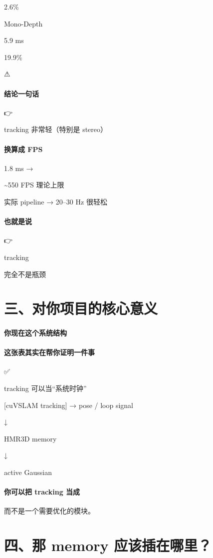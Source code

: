 \documentclass[12pt]{article}
\begin{document}
2.6\%

Mono-Depth

5.9 ms

19.9\%

⚠

\paragraph{结论一句话}
👉

tracking 非常轻（特别是 stereo）

\paragraph{换算成 FPS}
1.8 ms →

\textasciitilde{}550 FPS 理论上限

实际 pipeline → 20–30 Hz 很轻松

\paragraph{也就是说}
👉

tracking

完全不是瓶颈

\section{三、对你项目的核心意义}
\paragraph{你现在这个系统结构}
\paragraph{这张表其实在帮你证明一件事}
✅

tracking 可以当“系统时钟”

[cuVSLAM tracking] → pose / loop signal

↓

HMR3D memory

↓

active Gaussian

\paragraph{你可以把 tracking 当成}
而不是一个需要优化的模块。

\section{四、那 memory 应该插在哪里？}
\end{document}
